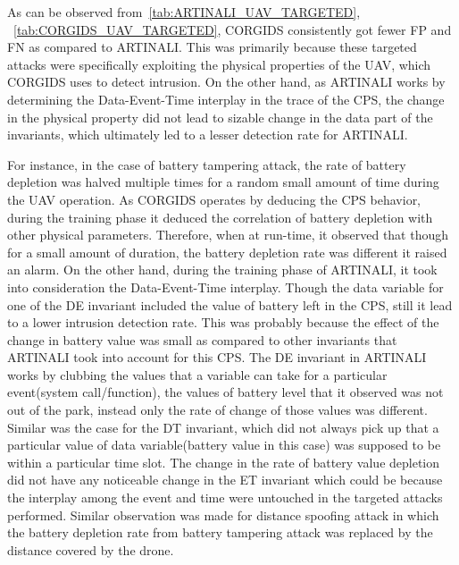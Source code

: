 As can be observed from~\autoref{tab:ARTINALI_UAV_TARGETED}, ~\autoref{tab:CORGIDS_UAV_TARGETED}, \ac{CORGIDS} consistently got fewer \ac{FP} and \ac{FN} as compared to ARTINALI. This was primarily because these targeted attacks were specifically exploiting the physical properties of the \ac{UAV}, which \ac{CORGIDS} uses to detect intrusion. On the other hand, as ARTINALI works by determining the Data-Event-Time interplay in the trace of the \ac{CPS}, the change in the physical property did not lead to sizable change in the data part of the invariants, which ultimately led to a lesser detection rate for ARTINALI.

For instance, in the case of battery tampering attack, the rate of battery depletion was halved multiple times for a random small amount of time during the \ac{UAV} operation. As \ac{CORGIDS} operates by deducing the \ac{CPS} behavior, during the training phase it deduced the correlation of battery depletion with other physical parameters. Therefore, when at run-time, it observed that though for a small amount of duration, the battery depletion rate was different it raised an alarm. On the other hand, during the training phase of ARTINALI, it took into consideration the Data-Event-Time interplay. Though the data variable for one of the D\textbar E invariant included the value of battery left in the \ac{CPS}, still it lead to a lower intrusion detection rate. This was probably because the effect of the change in battery value was small as compared to other invariants that ARTINALI took into account for this \ac{CPS}. The D\textbar E invariant in ARTINALI works by clubbing the values that a variable can take for a particular event(system call/function), the values of battery level that it observed was not out of the park, instead only the rate of change of those values was different. Similar was the case for the D\textbar T invariant, which did not always pick up that a particular value of data variable(battery value in this case) was supposed to be within a particular time slot. The change in the rate of battery value depletion did not have any noticeable change in the E\textbar T invariant which could be because the interplay among the event and time were untouched in the targeted attacks performed. Similar observation was made for distance spoofing attack in which the battery depletion rate from battery tampering attack was replaced by the distance covered by the drone.

